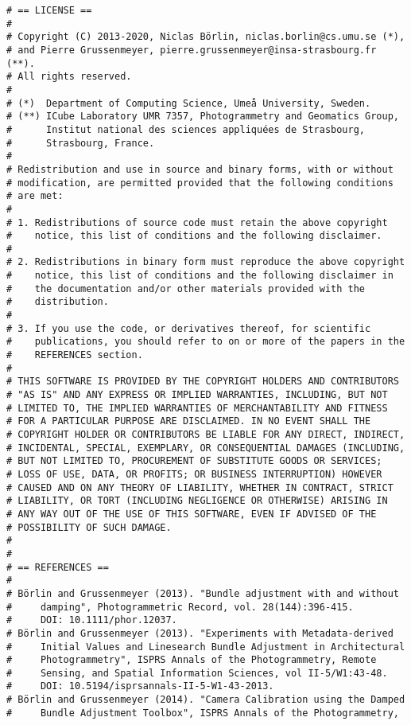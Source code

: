 \documentclass{article}
\begin{document}
\begin{verbatim}
# == LICENSE ==
#
# Copyright (C) 2013-2020, Niclas Börlin, niclas.borlin@cs.umu.se (*),
# and Pierre Grussenmeyer, pierre.grussenmeyer@insa-strasbourg.fr (**).
# All rights reserved.
#
# (*)  Department of Computing Science, Umeå University, Sweden. 
# (**) ICube Laboratory UMR 7357, Photogrammetry and Geomatics Group,
#      Institut national des sciences appliquées de Strasbourg,
#      Strasbourg, France.  
#
# Redistribution and use in source and binary forms, with or without
# modification, are permitted provided that the following conditions
# are met:
#
# 1. Redistributions of source code must retain the above copyright
#    notice, this list of conditions and the following disclaimer.
#
# 2. Redistributions in binary form must reproduce the above copyright
#    notice, this list of conditions and the following disclaimer in
#    the documentation and/or other materials provided with the
#    distribution.
#
# 3. If you use the code, or derivatives thereof, for scientific
#    publications, you should refer to on or more of the papers in the
#    REFERENCES section.
#
# THIS SOFTWARE IS PROVIDED BY THE COPYRIGHT HOLDERS AND CONTRIBUTORS
# "AS IS" AND ANY EXPRESS OR IMPLIED WARRANTIES, INCLUDING, BUT NOT
# LIMITED TO, THE IMPLIED WARRANTIES OF MERCHANTABILITY AND FITNESS
# FOR A PARTICULAR PURPOSE ARE DISCLAIMED. IN NO EVENT SHALL THE
# COPYRIGHT HOLDER OR CONTRIBUTORS BE LIABLE FOR ANY DIRECT, INDIRECT,
# INCIDENTAL, SPECIAL, EXEMPLARY, OR CONSEQUENTIAL DAMAGES (INCLUDING,
# BUT NOT LIMITED TO, PROCUREMENT OF SUBSTITUTE GOODS OR SERVICES;
# LOSS OF USE, DATA, OR PROFITS; OR BUSINESS INTERRUPTION) HOWEVER
# CAUSED AND ON ANY THEORY OF LIABILITY, WHETHER IN CONTRACT, STRICT
# LIABILITY, OR TORT (INCLUDING NEGLIGENCE OR OTHERWISE) ARISING IN
# ANY WAY OUT OF THE USE OF THIS SOFTWARE, EVEN IF ADVISED OF THE
# POSSIBILITY OF SUCH DAMAGE.
#
#
# == REFERENCES ==
#
# Börlin and Grussenmeyer (2013). "Bundle adjustment with and without
#     damping", Photogrammetric Record, vol. 28(144):396-415.
#     DOI: 10.1111/phor.12037.
# Börlin and Grussenmeyer (2013). "Experiments with Metadata-derived
#     Initial Values and Linesearch Bundle Adjustment in Architectural
#     Photogrammetry", ISPRS Annals of the Photogrammetry, Remote
#     Sensing, and Spatial Information Sciences, vol II-5/W1:43-48.
#     DOI: 10.5194/isprsannals-II-5-W1-43-2013.
# Börlin and Grussenmeyer (2014). "Camera Calibration using the Damped
#     Bundle Adjustment Toolbox", ISPRS Annals of the Photogrammetry,

\end{verbatim}
\end{document}
